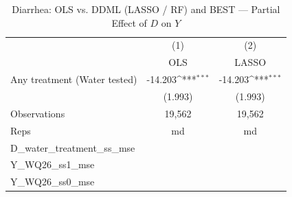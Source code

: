 \begin{table}[htbp]\centering
\def\sym#1{\ifmmode^{#1}\else\(^{#1}\)\fi}
\caption{Diarrhea: OLS vs. DDML (LASSO / RF) and BEST — Partial Effect of $D$ on $Y$}
\begin{tabular}{l*{2}{c}}
\toprule
                &\multicolumn{1}{c}{(1)}&\multicolumn{1}{c}{(2)}\\
                &\multicolumn{1}{c}{OLS}&\multicolumn{1}{c}{LASSO}\\
\midrule
Any treatment (Water tested)&  -14.203\sym{***}&  -14.203\sym{***}\\
                &  (1.993)         &  (1.993)         \\
\midrule
Observations    &   19,562         &   19,562         \\
Reps            &       md         &       md         \\
D\_water\_treatment\_ss\_mse&                  &                  \\
Y\_WQ26\_ss1\_mse  &                  &                  \\
Y\_WQ26\_ss0\_mse  &                  &                  \\
\bottomrule
\end{tabular}
\end{table}
